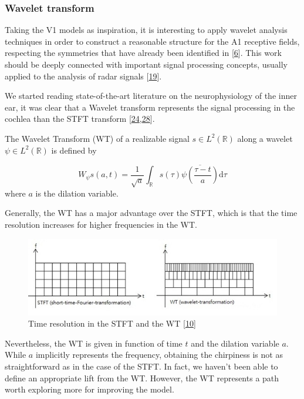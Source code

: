 \documentclass[american,]{article}
\theoremstyle{definition}
\theoremstyle{definition}
\theoremstyle{definition}
\theoremstyle{remark}
\begin{document}
\hypertarget{wavelet-transform}{%
\subsubsection{Wavelet transform}\label{wavelet-transform}}

Taking the V1 models as inspiration, it is interesting to apply wavelet analysis techniques
in order to construct a reasonable structure for the A1 receptive fields,
respecting the symmetries that have already been identified in {[}\protect\hyperlink{ref-boscain2021}{6}{]}.
This work should be deeply connected with important signal processing concepts,
usually applied to the analysis of radar signals {[}\protect\hyperlink{ref-mann1992}{19}{]}.

We started reading state-of-the-art literature on the neurophysiology of the inner ear,
it was clear that a Wavelet transform represents the signal processing
in the cochlea than the STFT transform {[}\protect\hyperlink{ref-reimann2011}{24},\protect\hyperlink{ref-yang1992}{28}{]}.

The Wavelet Transform (WT) of a realizable signal \(s\in L^2(\mathbb{R})\) along
a wavelet \(\psi\in L^2(\mathbb{R})\) is defined by

\begin{equation}
W_\psi s(a,t) = \frac{1}{\sqrt{a}} \int_\mathbb{R}s(\tau) \overline{\psi\left(\frac{\tau-t}{a}\right)} \mathrm{d}\tau
\end{equation}
where \(a\) is the dilation variable.

Generally, the WT has a major advantage over the STFT, which is that the time resolution
increases for higher frequencies in the WT.

\begin{figure}
\centering
\includegraphics{img/stft_vs_wt.jpg}
\caption{Time resolution in the STFT and the WT {[}\protect\hyperlink{ref-stft_vs_wt}{10}{]}}
\end{figure}

Nevertheless, the WT is given in function of time \(t\) and the dilation variable \(a\).
While \(a\) implicitly represents the frequency, obtaining the chirpiness
is not as straightforward as in the case of the STFT.
In fact, we haven't been able to define an appropriate lift from the WT.
However, the WT represents a path worth exploring more for improving the model.
\end{document}
